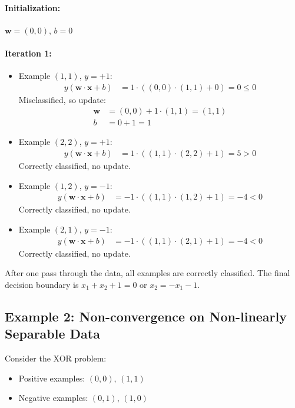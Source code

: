 \documentclass{article}
\begin{document}
\paragraph{Initialization:} $\mathbf{w} = (0,0)$, $b = 0$

\paragraph{Iteration 1:}
\begin{itemize}
    \item Example $(1,1)$, $y = +1$:
    \begin{align}
        y(\mathbf{w} \cdot \mathbf{x} + b) &= 1 \cdot ((0,0) \cdot (1,1) + 0) = 0 \leq 0
    \end{align}
    Misclassified, so update:
    \begin{align}
        \mathbf{w} &= (0,0) + 1 \cdot (1,1) = (1,1)\\
        b &= 0 + 1 = 1
    \end{align}
    
    \item Example $(2,2)$, $y = +1$:
    \begin{align}
        y(\mathbf{w} \cdot \mathbf{x} + b) &= 1 \cdot ((1,1) \cdot (2,2) + 1) = 5 > 0
    \end{align}
    Correctly classified, no update.
    
    \item Example $(1,2)$, $y = -1$:
    \begin{align}
        y(\mathbf{w} \cdot \mathbf{x} + b) &= -1 \cdot ((1,1) \cdot (1,2) + 1) = -4 < 0
    \end{align}
    Correctly classified, no update.
    
    \item Example $(2,1)$, $y = -1$:
    \begin{align}
        y(\mathbf{w} \cdot \mathbf{x} + b) &= -1 \cdot ((1,1) \cdot (2,1) + 1) = -4 < 0
    \end{align}
    Correctly classified, no update.
\end{itemize}

After one pass through the data, all examples are correctly classified. The final decision boundary is $x_1 + x_2 + 1 = 0$ or $x_2 = -x_1 - 1$.

\subsection{Example 2: Non-convergence on Non-linearly Separable Data}
Consider the XOR problem:
\begin{itemize}
    \item Positive examples: $(0,0)$, $(1,1)$
    \item Negative examples: $(0,1)$, $(1,0)$
\end{itemize}
\end{document}
